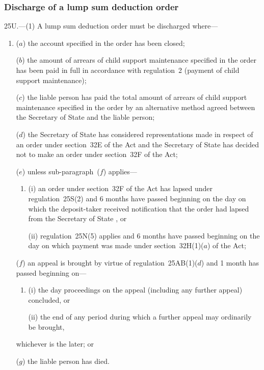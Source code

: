 \documentclass[12pt,a4paper]{article}
\begin{document}

\subsubsection[25U. Discharge of a lump sum deduction order]{Discharge of a lump sum deduction order}

25U.---(1)  A lump sum deduction order must be discharged where—
\begin{enumerate}\item[]
($a$) the account specified in the order has been closed;

($b$) the amount of arrears of child support maintenance specified in the order has been paid in full in accordance with regulation~2 (payment of child support maintenance);

($c$) the liable person has paid the total amount of arrears of child support maintenance specified in the order by an alternative method agreed between the 
Secretary of State  %
and the liable person;

($d$) the 
Secretary of State  %
has considered representations made in respect of an order under section~32E of the Act and 
the Secretary of State  %
has decided not to make an order under section~32F of the Act;

($e$) unless sub-paragraph~($f$)  applies—
\begin{enumerate}\item[]
(i) an order under section~32F of the Act has lapsed under regulation~25S(2) and 6 months have passed beginning on the day on which the deposit-taker received notification that the order had lapsed from the 
Secretary of State%
, or

(ii) regulation~25N(5) applies and 6 months have passed beginning on the day on which payment was made under section~32H(1)($a$)  of the Act;
\end{enumerate}

($f$) an appeal is brought by virtue of regulation~25AB(1)($d$)  and 1 month has passed beginning on—
\begin{enumerate}\item[]
(i) the day proceedings on the appeal (including any further appeal) concluded, or

(ii) the end of any period during which a further appeal may ordinarily be brought,
\end{enumerate}
whichever is the later; or

($g$) the liable person has died.
\end{enumerate}
\end{document}

